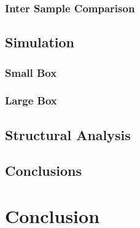 \documentclass{uscthesis}
\theoremstyle{definition}
\theoremstyle{plain}
\begin{document}
\subsection{Inter Sample Comparison}
\section{Simulation}
\subsection{Small Box}
\subsection{Large Box}
\section{Structural Analysis}
\section{Conclusions}

\chapter{Conclusion}


\Appendix                 %
	
\end{document}
